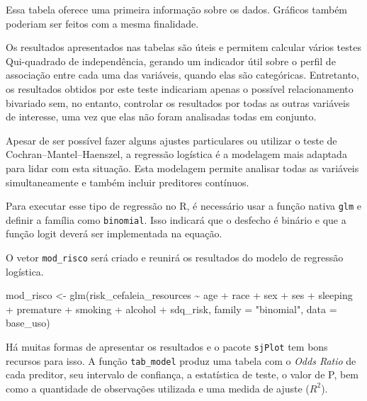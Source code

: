 \documentclass[
]{book}
\newenvironment{Shaded}{\begin{snugshade}}{\end{snugshade}}
\newcommand{\AttributeTok}[1]{\textcolor[rgb]{0.77,0.63,0.00}{#1}}
\newcommand{\FunctionTok}[1]{\textcolor[rgb]{0.00,0.00,0.00}{#1}}
\newcommand{\NormalTok}[1]{#1}
\newcommand{\OtherTok}[1]{\textcolor[rgb]{0.56,0.35,0.01}{#1}}
\newcommand{\SpecialCharTok}[1]{\textcolor[rgb]{0.00,0.00,0.00}{#1}}
\newcommand{\StringTok}[1]{\textcolor[rgb]{0.31,0.60,0.02}{#1}}
\begin{document}
Essa tabela oferece uma primeira informação sobre os dados. Gráficos também poderiam ser feitos com a mesma finalidade.

Os resultados apresentados nas tabelas são úteis e permitem calcular vários testes Qui-quadrado de independência, gerando um indicador útil sobre o perfil de associação entre cada uma das variáveis, quando elas são categóricas. Entretanto, os resultados obtidos por este teste indicariam apenas o possível relacionamento bivariado sem, no entanto, controlar os resultados por todas as outras variáveis de interesse, uma vez que elas não foram analisadas todas em conjunto.

Apesar de ser possível fazer alguns ajustes particulares ou utilizar o teste de Cochran--Mantel--Haenszel, a regressão logística é a modelagem mais adaptada para lidar com esta situação. Esta modelagem permite analisar todas as variáveis simultaneamente e também incluir preditores contínuos.

Para executar esse tipo de regressão no R, é necessário usar a função nativa \texttt{glm} e definir a família como \texttt{binomial}. Isso indicará que o desfecho é binário e que a função logit deverá ser implementada na equação.

O vetor \texttt{mod\_risco} será criado e reunirá os resultados do modelo de regressão logística.

\begin{Shaded}
\begin{Highlighting}[]
\NormalTok{mod\_risco }\OtherTok{\textless{}{-}} \FunctionTok{glm}\NormalTok{(risk\_cefaleia\_resources }\SpecialCharTok{\textasciitilde{}}
\NormalTok{                   age }\SpecialCharTok{+}\NormalTok{ race }\SpecialCharTok{+}\NormalTok{  sex }\SpecialCharTok{+}\NormalTok{ ses }\SpecialCharTok{+}\NormalTok{ sleeping }\SpecialCharTok{+}\NormalTok{ premature }\SpecialCharTok{+}
\NormalTok{                   smoking }\SpecialCharTok{+}\NormalTok{ alcohol }\SpecialCharTok{+}\NormalTok{ sdq\_risk, }
                 \AttributeTok{family =} \StringTok{"binomial"}\NormalTok{, }
                 \AttributeTok{data =}\NormalTok{ base\_uso)}
\end{Highlighting}
\end{Shaded}

Há muitas formas de apresentar os resultados e o pacote \texttt{sjPlot} tem bons recursos para isso. A função \texttt{tab\_model} produz uma tabela com o \emph{Odds Ratio} de cada preditor, seu intervalo de confiança, a estatística de teste, o valor de P, bem como a quantidade de observações utilizada e uma medida de ajuste (\(R^2\)).
\end{document}
